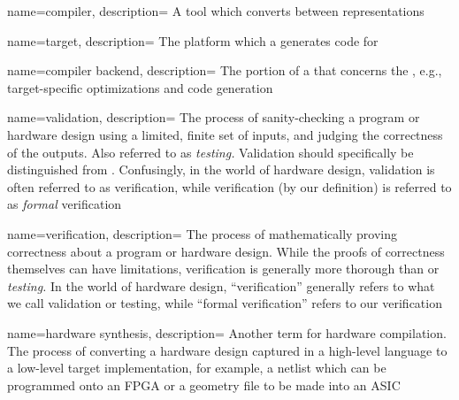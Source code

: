 
\ifarxiv
\else
\DeclareRobustCommand{\glossfirstformat}[1]{\textit{#1}}
\renewcommand*{\glsdisplayfirst}[4]{\glossfirstformat{#1#4}}
\usepackage[normalem]{ulem}
\renewcommand*{\glstextformat}[1]{\color{lightgray}{\dotuline{\color{black} #1}}}
\fi


\makenoidxglossaries


{
    name=compiler,
    description={
A tool which converts between representations}
}


{
    name=target,
    description={
The platform which a  generates code for}
}

{
    name=compiler backend,
    description={
The portion of a  that concerns the ,
  e.g., target-specific optimizations and code generation}
}

{
    name=validation,
    description={
The process of sanity-checking a program or hardware design using a
  limited, finite set
  of inputs, and judging the correctness 
  of the outputs.
Also referred to as \textit{testing.}
Validation should specifically be distinguished from
  .
Confusingly, 
  in the world of hardware design,
  validation is often referred to as
  verification,
  while verification (by our definition)
  is referred to as \textit{formal} verification}
}

{
    name=verification,
    description={
The process of mathematically proving correctness
  about a program or hardware design.
While the proofs of correctness themselves
  can have limitations,
  verification is generally more thorough
  than  or \textit{testing.}
In the world of hardware design,
  ``verification''
  generally refers to what we call validation or testing,
  while ``formal verification''
  refers to our verification}
}

{
    name={hardware synthesis},
    description={
Another term for hardware compilation.
The process of converting a hardware design
  captured in a high-level language
  to a low-level target implementation,
  for example,
  a \gls{netlist} which can be programmed onto an FPGA
  or a geometry file to be made into an ASIC}
}

